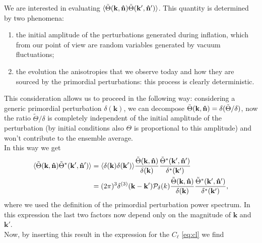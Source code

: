 We are interested in evaluating $\langle\tilde\Theta(\mathbf{k},\mathbf{\hat{n}})\tilde\Theta(\mathbf{k}',\mathbf{\hat{n}}')\rangle$. This quantity is determined by two phenomena:
\begin{enumerate}
    \item the initial amplitude of the perturbations generated during inflation, which from our point of view are random variables generated by vacuum fluctuations;
    \item the evolution the anisotropies that we observe today and how they are sourced by the primordial perturbations: this process is clearly deterministic. 
\end{enumerate}
This consideration allows us to proceed in the following way: considering a generic primordial perturbation $\delta(\mathbf{k})$, we can decompose $ \tilde\Theta(\mathbf{k},\mathbf{\hat{n}})=\delta (\tilde\Theta/\delta) $, now the ratio $\tilde\Theta/\delta$ is completely independent of the initial amplitude of the perturbation (by initial conditions also $\Theta$ is proportional to this amplitude) and won't contribute to the ensemble average.\\
In this way we get
\begin{align*}
    \langle\tilde\Theta(\mathbf{k},\mathbf{\hat{n}})\tilde\Theta^*(\mathbf{k}',\mathbf{\hat{n}}')\rangle &= \langle\delta(\mathbf{k})\delta(\mathbf{k}')\rangle\frac{\tilde\Theta(\mathbf{k},\mathbf{\hat{n}})}{\delta(\mathbf{k})}\frac{\tilde\Theta^*(\mathbf{k}',\mathbf{\hat{n}}')}{\delta^*(\mathbf{k}')}\\
    &= (2\pi)^3\delta^{(3)}(\mathbf{k}-\mathbf{k}')\mathcal P_{\delta}(k)\frac{\tilde\Theta(\mathbf{k},\mathbf{\hat{n}})}{\delta(\mathbf{k})}\frac{\tilde\Theta^*(\mathbf{k}',\mathbf{\hat{n}}')}{\delta^*(\mathbf{k}')},
\end{align*}
where we used the definition of the primordial perturbation power spectrum. In this expression the last two factors now depend only on the magnitude of $\mathbf k$ and $\mathbf k'$.\\Now, by inserting this result in the expression for the $C_\ell$ \eqref{eq:cl} we find 
